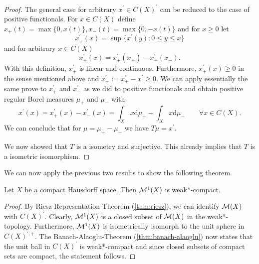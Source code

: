 \begin{proof}
	The general case for arbitrary $x^\prime\in C(X)^\prime$ can be reduced to the case of positive functionals. For $x\in C(X)$ define $x_+(t)=\max\{0,x(t)\}, x_-(t)=\max\{0,-x(t)\}$ and for $x\geq 0$ let
	\[
	x^\prime_+(x)=\sup\{x^\prime(y)\colon 0\leq y\leq x\}
	\]
	and for arbitrary $x\in C(X)$
	\[
	x^\prime_+(x)=x^\prime_+(x_+)-x^\prime_+(x_-).
	\]
	With this definition, $x^\prime_+$ is linear and continuous. Furthermore, $x^\prime_+(x)\geq 0$ in the sense mentioned above and $x^\prime_-:=x^\prime_+-x^\prime\geq 0$. We can apply essentially the same prove to $x^\prime_+$ and $x^\prime_-$ as we did to positive functionals and obtain positive regular Borel measures $\mu_+$ and $\mu_-$ with
	\[
	x^\prime(x)=x^\prime_+(x)-x^\prime_-(x)=\int_X x\mathrm{d}\mu_+-\int_Xx\mathrm{d}\mu_-\qquad \forall x\in C(X).
	\] 
	We can conclude that for $\mu=\mu_+-\mu_-$ we have $T\mu=x^\prime$.
	
	We now showed that $T$ is a isometry and surjective. This already implies that $T$ is a isometric isomorphism.
\end{proof}


We can now apply the previous two results to show the following theorem.
\begin{theorem}\label{thm:compactness}
	Let $X$ be a compact Hausdorff space. Then $\mathcal{M}^1(X)$ is weak*-compact.
\end{theorem}
\begin{proof}
	By Riesz-Representation-Theorem (\autoref{thm:riesz}), we can identify $\mathcal{M}(X)$ with $C(X)^\prime$. Clearly, $\mathcal{M}^1(X)$ is a closed subset of $\mathcal{M}(X)$ in the weak*-topology. Furthermore, $\mathcal{M}^1(X)$ is isometrically isomorph to the unit sphere in $C(X)^{\prime,+}$. The Banach-Alaoglu-Theorem (\autoref{thm:banach-alaoglu}) now states that the unit ball in $C(X)^\prime$ is weak*-compact and since closed subsets of compact sets are compact, the statement follows.
\end{proof}

